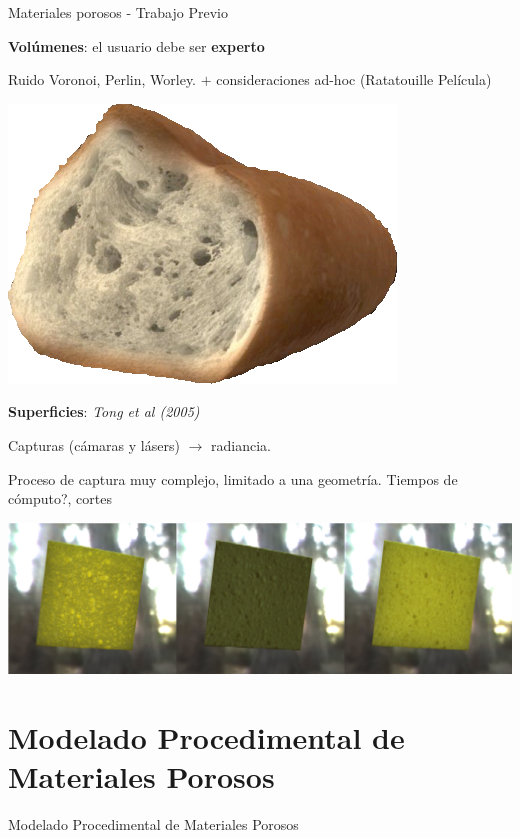 \documentclass[spanish,unknownkeysallowed,10pt]{beamer}
\begin{document}
\begin{frame}{Materiales porosos - Trabajo Previo}

\textbf{Volúmenes}: el usuario debe ser \textbf{experto}

Ruido Voronoi, Perlin, Worley. $+$ consideraciones ad-hoc (Ratatouille Película)

\centerline{\includegraphics[scale = 0.2]{../figures/ratatouille}}

\textbf{Superficies}: {\it Tong et al (2005)}

Capturas (cámaras y lásers) $\rightarrow$ radiancia.

Proceso de captura muy complejo, limitado a una geometría. Tiempos de cómputo?, cortes

\centerline{\includegraphics[scale = 0.2]{../figures/esponja}}

\end{frame}


\section[Mod. de Materiales Porosos]{Modelado Procedimental de Materiales Porosos}

\begin{frame}
\begin{block}{}
\begin{center}
\vspace{1cm}
\huge{Modelado Procedimental de Materiales Porosos}
\vspace{1cm}
\end{center}
\end{block}
\end{frame}
\end{document}
